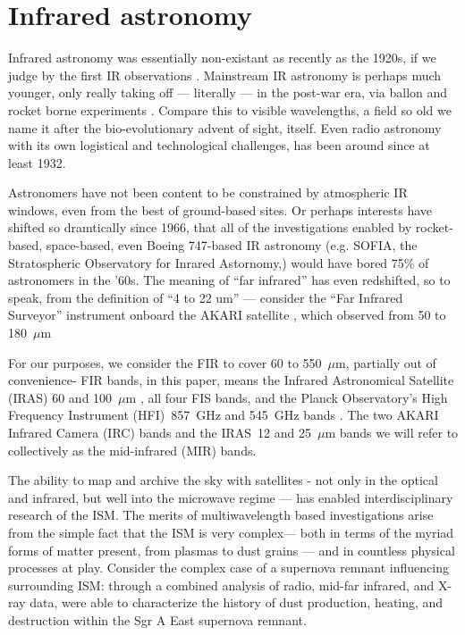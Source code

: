   \section{Infrared astronomy}

    Infrared astronomy was essentially non-existant as recently as the 1920s, if we judge by the first IR observations \citep{pettit22, pettit28}. Mainstream IR astronomy is perhaps much younger, only really taking off --- literally --- in the post-war era, via ballon and rocket borne experiments \citep{johnson66}. Compare this to visible wavelengths, a field so old we name it after the bio-evolutionary advent of sight, itself. Even radio astronomy with its own logistical and technological challenges, has been around since at least 1932.

    Astronomers have not been content to be constrained by atmospheric IR windows, even from the best of ground-based sites. Or perhaps interests have shifted so dramtically since 1966, that all of the investigations enabled by rocket-based, space-based, even Boeing 747-based IR astronomy (e.g. SOFIA, the Stratospheric Observatory for Inrared Astornomy,\cite{young12}) would have bored 75\% of astronomers in the '60s. The meaning of ``far infrared'' has even redshifted, so to speak, from the \cite{johnson66} definition of ``4 to 22 um'' --- consider the ``Far Infrared Surveyor'' instrument onboard the AKARI satellite \citep{akari07}, which observed from 50 to 180~$\mu$m \citep{kawada07}

     For our purposes, we consider the FIR to cover 60 to 550~$\mu$m, partially out of convenience- FIR bands, in this paper, means the Infrared Astronomical Satellite (IRAS) 60 and 100~$\mu$m \citep{iras84}, all four FIS bands, and the Planck Observatory's High Frequency Instrument (HFI)~857~GHz and 545~GHz bands \citep{planckEarly11I, hfi14viii}. The two AKARI Infrared Camera (IRC) \citep{irc07,ishihara10} bands and the IRAS~12 and 25~$\mu$m bands we will refer to collectively as the mid-infrared (MIR) bands.

    The ability to map and archive the sky with satellites - not only in the optical and infrared, but well into the microwave regime --- has enabled interdisciplinary research of the ISM. The merits of multiwavelength based investigations arise from the simple fact that the ISM is very complex--- both in terms of the myriad forms of matter present, from plasmas to dust grains --- and in countless physical processes at play. Consider the complex case of a supernova remnant influencing surrounding ISM: through a combined analysis of radio, mid-far infrared, and X-ray data, \cite{lau15} were able to characterize the history of dust production, heating, and destruction within the Sgr A East supernova remnant.

